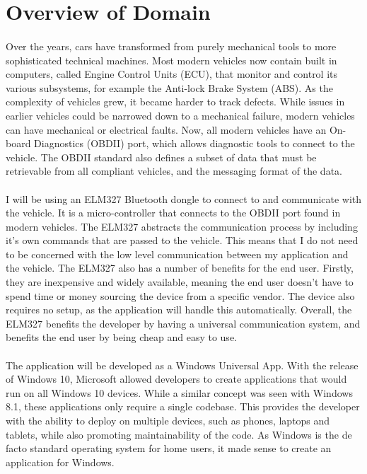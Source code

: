 \section{Overview of Domain}
	\paragraph{}{
	Over the years, cars have transformed from purely mechanical tools to more sophisticated technical machines. Most modern vehicles now contain built in computers, called Engine Control Units (ECU), that monitor and control its various subsystems, for example the Anti-lock Brake System (ABS). As the complexity of vehicles grew, it became harder to track defects. While issues in earlier vehicles could be narrowed down to a mechanical failure, modern vehicles can have mechanical or electrical faults. Now, all modern vehicles have an On-board Diagnostics (OBDII) port, which allows diagnostic tools to connect to the vehicle. The OBDII standard also defines a subset of data that must be retrievable from all compliant vehicles, and the messaging format of the data.		 
	}
	\paragraph{}{
	I will be using an ELM327 Bluetooth dongle to connect to and communicate with the vehicle. It is a micro-controller that connects to the OBDII port found in modern vehicles. The ELM327 abstracts the communication process by including it's own commands that are passed to the vehicle. This means that I do not need to be concerned with the low level communication between my application and the vehicle.	The ELM327 also has a number of benefits for the end user. Firstly, they are inexpensive and widely available, meaning the end user doesn't have to spend time or money sourcing the device from a specific vendor. The device also requires no setup, as the application will handle this automatically. Overall, the ELM327 benefits the developer by having a universal communication system, and benefits the end user by being cheap and easy to use.
	}
	\paragraph{}{
	The application will be developed as a Windows Universal App. With the release of Windows 10, Microsoft allowed developers to create applications that would run on all Windows 10 devices. While a similar concept was seen with Windows 8.1, these applications only require a single codebase. This provides the developer with the ability to deploy on multiple devices, such as phones, laptops and tablets, while also promoting maintainability of the code. As Windows is the de facto standard operating system for home users, it made sense to create an application for Windows.
	}
